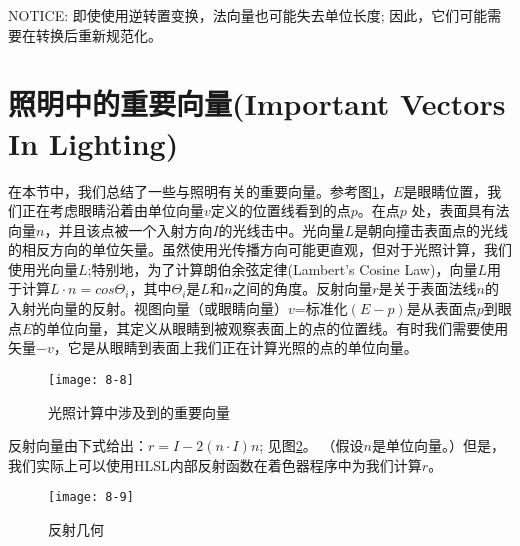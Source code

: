 \begin{flushleft}
NOTICE: 即使使用逆转置变换，法向量也可能失去单位长度; 因此，它们可能需要在转换后重新规范化。
\end{flushleft}

\section{照明中的重要向量(Important Vectors In Lighting)}
\begin{flushleft}
在本节中，我们总结了一些与照明有关的重要向量。参考图\ref{fig:8-8}，$E$是眼睛位置，我们正在考虑眼睛沿着由单位向量$v$定义的位置线看到的点$p$。在点$p$ 处，表面具有法向量$n$，并且该点被一个入射方向$I$的光线击中。光向量$L$是朝向撞击表面点的光线的相反方向的单位矢量。虽然使用光传播方向可能更直观，但对于光照计算，我们使用光向量$L$;特别地，为了计算朗伯余弦定律(Lambert’s Cosine Law)，向量$L$用于计算$L\cdot n=cos\Theta_{i}$，其中$\Theta_{i}$是$L$和$n$之间的角度。反射向量$r$是关于表面法线$n$的入射光向量的反射。视图向量（或眼睛向量）$v$=标准化$(E-p)$是从表面点$p$到眼点$E$的单位向量，其定义从眼睛到被观察表面上的点的位置线。有时我们需要使用矢量$-v$，它是从眼睛到表面上我们正在计算光照的点的单位向量。\\
\end{flushleft}

\begin{figure}[h]
    \texttt{[image: 8-8]}
    \centering
    \caption{光照计算中涉及到的重要向量}
    \label{fig:8-8}
\end{figure}

\begin{flushleft}
反射向量由下式给出：$r=I-2(n\cdot I)n$; 见图\ref{fig:8-9}。 （假设$n$是单位向量。）但是，我们实际上可以使用HLSL内部反射函数在着色器程序中为我们计算$r$。
\end{flushleft}

\begin{figure}[h]
    \texttt{[image: 8-9]}
    \centering
    \caption{反射几何}
    \label{fig:8-9}
\end{figure}


